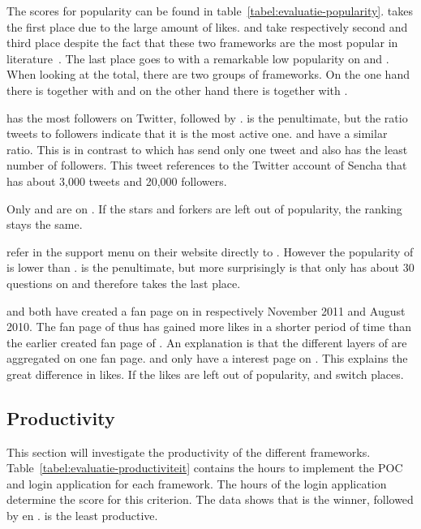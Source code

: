 \documentclass[a4paper]{artikel3}
\begin{document}
The scores for popularity can be found in table~\ref{tabel:evaluatie-popularity}. 
\kendoa{} takes the first place due to the large amount of \fb{} likes.
\jqma{} and \sta{} take respectively second and third place despite the fact that these two frameworks are the most popular in literature~\cite{David2011,Firtman2013,Hales2012,Oeflman2011}. 
The last place goes to \lungo{} with a remarkable low popularity on \so{} and \fb.
When looking at the total, there are two groups of frameworks.
On the one hand there is \kendoa{} together with \jqma{} and on the other hand there is \sta{} together with \lungo{}.

\jqma{} has the most followers on Twitter, followed by \kendoa.
\lungo{} is the penultimate, but the ratio tweets to followers indicate that it is the most active one. 
\jqma{} and \kendoa{} have a similar ratio.
This is in contrast to \sta{} which has send only one tweet and also has the least number of followers. 
This tweet references to the Twitter account of Sencha that has about 3,000 tweets and 20,000 followers.

Only \jqma{} and \lungo{} are on \gh{}. 
If the \gh{} stars and \gh{} forkers are left out of popularity, the ranking stays the same.

\kendoa{} refer in the support menu on their website directly to \so{}. 
However the popularity of \kendoa{} is lower than \jqma{}.
\sta{} is the penultimate, but more surprisingly is that \lungo{} only has about 30 questions on \so{} and therefore takes the last place.

\kendoa{} and \jqma{} both have created a fan page on \fb{} in respectively November 2011 and August 2010.
The fan page of \kendoa{} thus has gained more \fb{} likes in a shorter period of time than the earlier created fan page of \jqma{}.
An explanation is that the different layers of \kendo{} are aggregated on one fan page.
\sta{} and \lungo{} only have a interest page on \fb.
This explains the great difference in \fb{} likes.
If the likes are left out of popularity, \kendoa{} and \jqma{} switch places.


\subsection{Productivity} %
\label{sec:evaluation-productivity}

This section will investigate the productivity of the different frameworks.
Table~\ref{tabel:evaluatie-productiviteit} contains the hours to implement the POC and login application for each framework.
The hours of the login application determine the score for this criterion.
The data shows that \jqma{} is the winner,  followed by \lungo{} en \kendoa{}.
\sta{} is the least productive.
\end{document}
